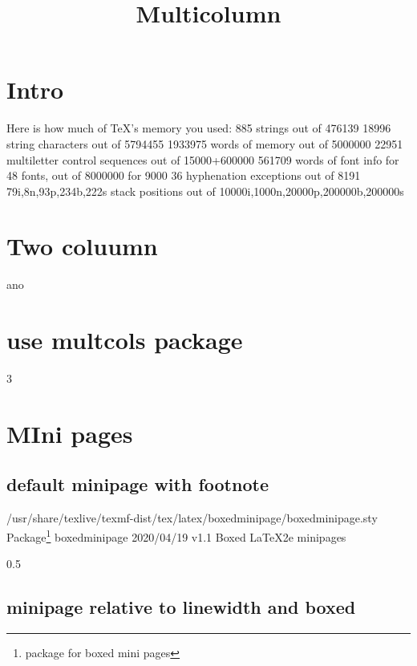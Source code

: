 \documentclass{article}
\title{Multicolumn}
\begin{document}
	\maketitle
	\section{Intro}
		Here is how much of TeX's memory you used:
885 strings out of 476139
18996 string characters out of 5794455
1933975 words of memory out of 5000000
22951 multiletter control sequences out of 15000+600000
561709 words of font info for 48 fonts, out of 8000000 for 9000
36 hyphenation exceptions out of 8191
79i,8n,93p,234b,222s stack positions out of 10000i,1000n,20000p,200000b,200000s

		\vspace{2cm}
	\section{Two coluumn}
	
	\lipsum[1-4]
	\par
		ano
	
	\section{use multcols package}
	\begin{multicols}{3}
	\lipsum[1]
	\end{multicols}
	
	\section{MIni pages}
	
	\begin{minipage}[t]{.4\linewidth}
		\subsection{default minipage with footnote}
		\lipsum[1][1-4]
		\par 
			/usr/share/texlive/texmf-dist/tex/latex/boxedminipage/boxedminipage.sty
			Package\footnote{package for boxed mini pages} boxedminipage 2020/04/19 v1.1 Boxed LaTeX2e minipages
		\bigskip	
	\end{minipage}
	
	\begin{boxedminipage}[t]{0.5\linewidth}
		\subsection{minipage relative to linewidth and boxed}
		\lipsum[1][1-4]	
	\end{boxedminipage}
	
\end{document}
